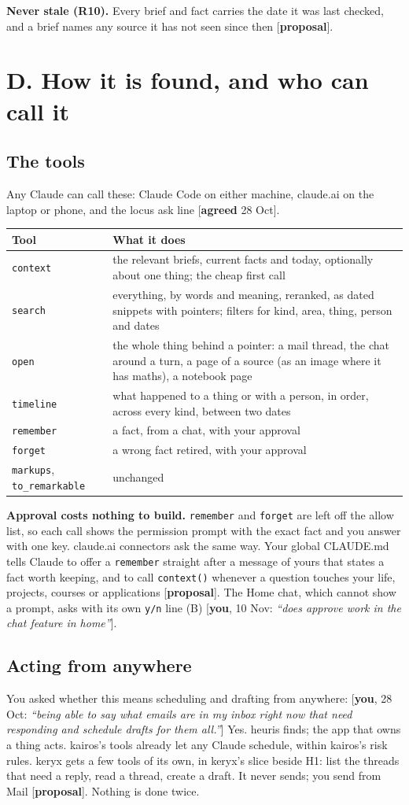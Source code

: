 \documentclass[10pt]{extarticle}
\newcommand{\you}[2]{{\small[\textbf{you}, #1: \textit{``#2''}]}}
\newcommand{\agreed}[1]{{\small[\textbf{agreed} #1]}}
\newcommand{\prop}{{\small[\textbf{proposal}]}}
\newcommand{\Sec}[1]{\section*{#1}\addcontentsline{toc}{section}{#1}}
\newcommand{\Sub}[1]{\subsection*{#1}}
\begin{document}
\textbf{Never stale (R10).} Every brief and fact carries the date it was last checked, and a brief names any source it has not seen since then \prop.

\Sec{D. How it is found, and who can call it}

\Sub{The tools}
Any Claude can call these: Claude Code on either machine, claude.ai on the laptop or phone, and the locus ask line \agreed{28 Oct}.

\begin{tabularx}{\linewidth}{@{}l Y@{}}
\toprule
Tool & What it does \\
\midrule
\texttt{context} & the relevant briefs, current facts and today, optionally about one thing; the cheap first call \\
\texttt{search} & everything, by words and meaning, reranked, as dated snippets with pointers; filters for kind, area, thing, person and dates \\
\texttt{open} & the whole thing behind a pointer: a mail thread, the chat around a turn, a page of a source (as an image where it has maths), a notebook page \\
\texttt{timeline} & what happened to a thing or with a person, in order, across every kind, between two dates \\
\texttt{remember} & a fact, from a chat, with your approval \\
\texttt{forget} & a wrong fact retired, with your approval \\
\texttt{markups}, \texttt{to\_remarkable} & unchanged \\
\bottomrule
\end{tabularx}

\medskip
\textbf{Approval costs nothing to build.} \texttt{remember} and \texttt{forget} are left off the allow list, so each call shows the permission prompt with the exact fact and you answer with one key. claude.ai connectors ask the same way. Your global CLAUDE.md tells Claude to offer a \texttt{remember} straight after a message of yours that states a fact worth keeping, and to call \texttt{context()} whenever a question touches your life, projects, courses or applications \prop. The Home chat, which cannot show a prompt, asks with its own \texttt{y/n} line (B) \you{10 Nov}{does approve work in the chat feature in home}.

\Sub{Acting from anywhere}
You asked whether this means scheduling and drafting from anywhere: \you{28 Oct}{being able to say what emails are in my inbox right now that need responding and schedule drafts for them all.} Yes. heuris finds; the app that owns a thing acts. kairos's tools already let any Claude schedule, within kairos's risk rules. keryx gets a few tools of its own, in keryx's slice beside H1: list the threads that need a reply, read a thread, create a draft. It never sends; you send from Mail \prop. Nothing is done twice.
\end{document}

